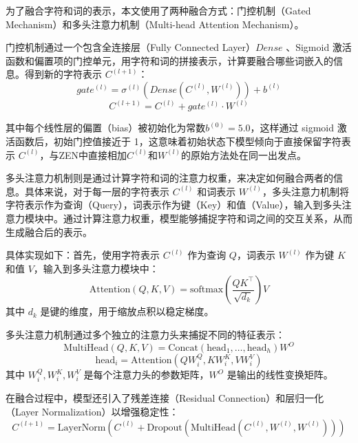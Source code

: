 \documentclass[12pt, a4paper]{ctexart}
\begin{document}
为了融合字符和词的表示，本文使用了两种融合方式：门控机制（Gated Mechanism）和多头注意力机制（Multi-head Attention Mechanism）。

门控机制通过一个包含全连接层（Fully Connected Layer）$Dense$ 、Sigmoid 激活函数和偏置项的门控单元，用字符和词的拼接表示，计算要融合哪些词嵌入的信息。得到新的字符表示 $C^{(l+1)}$：
\begin{equation}
        gate^{(l)} = {\sigma}^{(l)} (Dense(C^{(l)}, W^{(l)}) ) + b^{(l)} 
\end{equation}
\begin{equation}
    C^{(l+1)} = C^{(l)} + gate^{(l)} \cdot W^{(l)}
\end{equation}

其中每个线性层的偏置（bias）被初始化为常数$b^{(0)} = 5.0$，这样通过 sigmoid 激活函数后，初始门控值接近于 1，这意味着初始状态下模型倾向于直接保留字符表示 $C^{(l)}$，与ZEN中直接相加$C^{(l)}$和$W^{(l)}$的原始方法处在同一出发点。

\vspace{2em} %

多头注意力机制则是通过计算字符和词的注意力权重，来决定如何融合两者的信息。具体来说，对于每一层的字符表示 $C^{(l)}$ 和词表示 $W^{(l)}$，多头注意力机制将字符表示作为查询（Query），词表示作为键（Key）和值（Value），输入到多头注意力模块中。通过计算注意力权重，模型能够捕捉字符和词之间的交互关系，从而生成融合后的表示。

具体实现如下：首先，使用字符表示 $C^{(l)}$ 作为查询 $Q$，词表示 $W^{(l)}$ 作为键 $K$ 和值 $V$，输入到多头注意力模块中：
\begin{equation}
    \text{Attention}(Q, K, V) = \text{softmax}\left(\frac{QK^\top}{\sqrt{d_k}}\right)V
\end{equation}
其中 $d_k$ 是键的维度，用于缩放点积以稳定梯度。

多头注意力机制通过多个独立的注意力头来捕捉不同的特征表示：
\begin{equation}
    \text{MultiHead}(Q, K, V) = \text{Concat}(\text{head}_1, \dots, \text{head}_h)W^O
\end{equation}
\begin{equation}
    \text{head}_i = \text{Attention}(QW_i^Q, KW_i^K, VW_i^V)
\end{equation}
其中 $W_i^Q, W_i^K, W_i^V$ 是每个注意力头的参数矩阵，$W^O$ 是输出的线性变换矩阵。

在融合过程中，模型还引入了残差连接（Residual Connection）和层归一化（Layer Normalization）以增强稳定性：
\begin{equation}
    C^{(l+1)} = \text{LayerNorm}(C^{(l)} + \text{Dropout}(\text{MultiHead}(C^{(l)}, W^{(l)}, W^{(l)})))
\end{equation}
\end{document}
